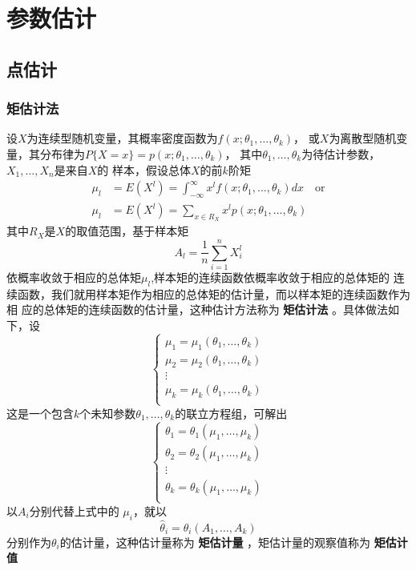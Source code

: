 \documentclass[11pt]{article}
\begin{document}
\section{参数估计}
\label{sec:orgd1397de}
\subsection{点估计}
\label{sec:org6fa5f02}
\subsubsection{矩估计法}
\label{sec:orgb6d91f3}
设\(X\)为连续型随机变量，其概率密度函数为\(f(x;\theta_1,\dots,\theta_k)\)，
或\(X\)为离散型随机变量，其分布律为\(P\{X=x\}=p(x;\theta_1,\dots,\theta_k)\)，
其中\(\theta_1,\dots,\theta_k\)为待估计参数，\(X_1,\dots,X_n\)是来自\(X\)的
样本，假设总体\(X\)的前\(k\)阶矩
\begin{align*}
 \mu_l&=E(X^l)=\int_{-\infty}^\infty x^lf(x;\theta_1,\dots,\theta_k)dx \quad\text{or}\\
 \mu_l&=E(X^l)=\sum_{x\in R_X}x^lp(x;\theta_1,\dots,\theta_k)
\end{align*}
其中\(R_X\)是\(X\)的取值范围，基于样本矩
\begin{equation*}
A_l=\frac{1}{n}\sum_{i=1}^nX_i^l
\end{equation*}
依概率收敛于相应的总体矩\(\mu_l\),样本矩的连续函数依概率收敛于相应的总体矩的
连续函数，我们就用样本矩作为相应的总体矩的估计量，而以样本矩的连续函数作为相
应的总体矩的连续函数的估计量，这种估计方法称为 \textbf{矩估计法} 。具体做法如下，设
\begin{equation*}
\begin{cases}
\mu_1=\mu_1(\theta_1,\dots,\theta_k)\\
\mu_2=\mu_2(\theta_1,\dots,\theta_k)\\
\vdots\\
\mu_k=\mu_k(\theta_1,\dots,\theta_k)\\
\end{cases}
\end{equation*}
这是一个包含\(k\)个未知参数\(\theta_1,\dots,\theta_k\)的联立方程组，可解出
\begin{equation*}
\begin{cases}
\theta_1=\theta_1(\mu_1,\dots,\mu_k)\\
\theta_2=\theta_2(\mu_1,\dots,\mu_k)\\
\vdots\\
\theta_k=\theta_k(\mu_1,\dots,\mu_k)\\
\end{cases}
\end{equation*}
以\(A_i\)分别代替上式中的 \(\mu_i\)，就以
\begin{equation*}
\hat{\theta}_i=\theta_i(A_1,\dots,A_k)
\end{equation*}
分别作为\(\theta_i\)的估计量，这种估计量称为 \textbf{矩估计量} ，矩估计量的观察值称为
\textbf{矩估计值}
\end{document}
